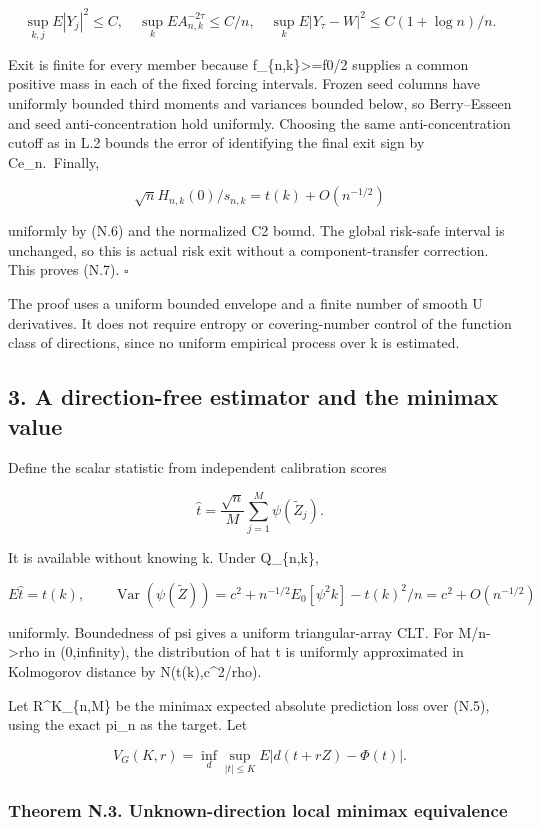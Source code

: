 \[
\sup_{k,j}E|Y_j|^2\le C,\quad
\sup_k E A_{n,k}^{-2\tau}\le C/n,\quad
\sup_k E|Y_\tau-W|^2\le C(1+\log n)/n.
\]

Exit is finite for every member because f\_\{n,k\}\textgreater=f0/2
supplies a common positive mass in each of the fixed forcing intervals.
Frozen seed columns have uniformly bounded third moments and variances
bounded below, so Berry--Esseen and seed anti-concentration hold
uniformly. Choosing the same anti-concentration cutoff as in L.2 bounds
the error of identifying the final exit sign by Ce\_n.~Finally,

\[
\sqrt n H_{n,k}(0)/s_{n,k}=t(k)+O(n^{-1/2})
\]

uniformly by (N.6) and the normalized C2 bound. The global risk-safe
interval is unchanged, so this is actual risk exit without a
component-transfer correction. This proves (N.7). \(\square\)

The proof uses a uniform bounded envelope and a finite number of smooth
U derivatives. It does not require entropy or covering-number control of
the function class of directions, since no uniform empirical process
over k is estimated.

\subsection{3. A direction-free estimator and the minimax
value}\label{a-direction-free-estimator-and-the-minimax-value}

Define the scalar statistic from independent calibration scores

\[
\widehat t=\frac{\sqrt n}{M}\sum_{j=1}^M\psi(\widetilde Z_j).
\tag{N.8}
\]

It is available without knowing k. Under Q\_\{n,k\},

\[
E\widehat t=t(k),\qquad
\operatorname{Var}(\psi(\widetilde Z))
=c^2+n^{-1/2}E_0[\psi^2 k]-t(k)^2/n
=c^2+O(n^{-1/2})
\tag{N.9}
\]

uniformly. Boundedness of psi gives a uniform triangular-array CLT. For
M/n-\textgreater rho in (0,infinity), the distribution of hat t is
uniformly approximated in Kolmogorov distance by N(t(k),c\^{}2/rho).

Let R\^{}K\_\{n,M\} be the minimax expected absolute prediction loss
over (N.5), using the exact pi\_n as the target. Let

\[
V_G(K,r)=\inf_d\sup_{|t|\le K}E|d(t+rZ)-\Phi(t)|.
\]

\subsubsection{Theorem N.3. Unknown-direction local minimax
equivalence}\label{theorem-n.3.-unknown-direction-local-minimax-equivalence}

